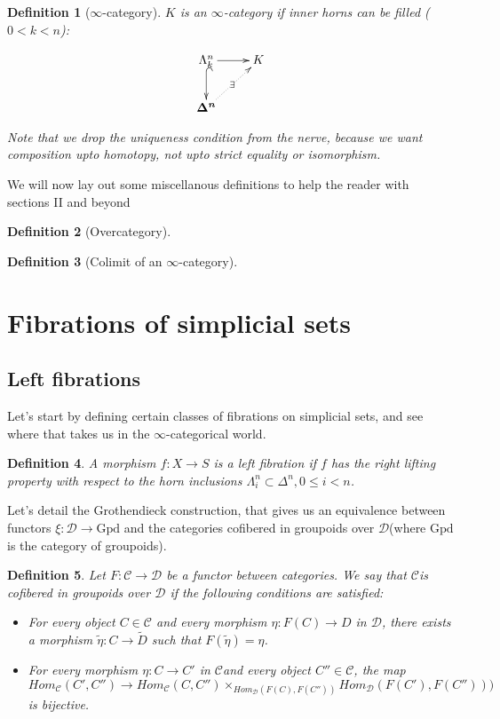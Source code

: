 \documentclass[12pt]{amsart}
\newcommand{\8}{\ensuremath{\infty}}
\newcommand{\C}{\ensuremath{\mathscr{C}}}
\newcommand{\D}{\ensuremath{\mathscr{D}}}
\newcommand{\Horn}[2]{\ensuremath{\Lambda^{#1}_{#2}}}
\newcommand{\Simplex}[1][n]{\ensuremath{\boldsymbol{\Delta^{#1}}}}
\newcommand{\Gpd}{\ensuremath{\text{Gpd}}}
\newtheorem{definition}{Definition}
\begin{document}
\begin{definition}[\8-category]
  $K$ is an \8-category if inner horns can be filled ($0 < k < n$):

  $$
    \begin{xy}
      \xymatrix{
        \Horn{n}{k}\ar[r]\ar@{^{(}->}[d] & K \\
        \Simplex\ar@{.>}[ur]|\exists &
      }
    \end{xy}
  $$

  Note that we drop the uniqueness condition from the nerve, because we want composition upto homotopy, not upto strict equality or isomorphism.
\end{definition}

We will now lay out some miscellanous definitions to help the reader with sections II and beyond

\begin{definition}[Overcategory]
\end{definition}

\begin{definition}[Colimit of an \8-category]
\end{definition}

\section{Fibrations of simplicial sets}

\subsection{Left fibrations}
Let's start by defining certain classes of fibrations on simplicial sets, and see where that takes us in the \8-categorical world.

\begin{definition}
  A morphism $f: X \rightarrow S$ is a left fibration if $f$ has the right lifting property with respect to the horn inclusions $\Lambda_i^n\subset \Delta^n, 0\leq i < n$.
\end{definition}

Let's detail the Grothendieck construction, that gives us an equivalence between functors $\xi : \D \rightarrow \Gpd$ and the categories cofibered in groupoids over \D (where \Gpd is the category of groupoids).

\begin{definition}
  Let $F: \C \rightarrow \D$ be a functor between categories. We say that \C is cofibered in groupoids over \D
  if the following conditions are satisfied:
  \begin{itemize}
    \item For every object $C \in \C$ and every morphism $\eta: F(C) \rightarrow D$ in \D , there exists a morphism $\tilde{\eta} : C \rightarrow \tilde{D}$ such that $F(\tilde{\eta}) = \eta$.
    \item For every morphism $\eta: C \rightarrow C'$ in \C and every object $C'' \in \C$, the map
          $$
            Hom_\C(C', C'') \rightarrow Hom_\C(C, C'')\times_{Hom_\mathcal{D}(F(C), F(C''))}Hom_\mathcal{D}(F(C'), F(C'')))
          $$
          is bijective.
  \end{itemize}
\end{definition}
\end{document}
